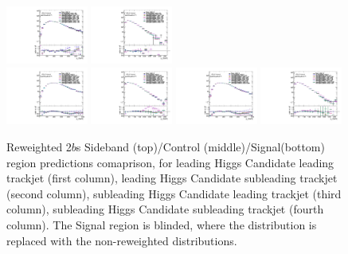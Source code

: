 \begin{figure}[htbp!]
\begin{center}
\includegraphics[width=0.24\textwidth,angle=-90]{figures/boosted/AppendixReweight/Compare/Data_TwoTag_split_Control_directcompare_sublHCand_trk0_Pt_1.pdf}
\includegraphics[width=0.24\textwidth,angle=-90]{figures/boosted/AppendixReweight/Compare/Data_TwoTag_split_Control_directcompare_sublHCand_trk1_Pt_1.pdf}\\
\includegraphics[width=0.24\textwidth,angle=-90]{figures/boosted/AppendixReweight/Compare/Data_TwoTag_split_Signal_directcompare_leadHCand_trk0_Pt_1.pdf}
\includegraphics[width=0.24\textwidth,angle=-90]{figures/boosted/AppendixReweight/Compare/Data_TwoTag_split_Signal_directcompare_leadHCand_trk1_Pt_1.pdf}
\includegraphics[width=0.24\textwidth,angle=-90]{figures/boosted/AppendixReweight/Compare/Data_TwoTag_split_Signal_directcompare_sublHCand_trk0_Pt_1.pdf}
\includegraphics[width=0.24\textwidth,angle=-90]{figures/boosted/AppendixReweight/Compare/Data_TwoTag_split_Signal_directcompare_sublHCand_trk1_Pt_1.pdf}\\
\caption{Reweighted 2$b$s Sideband (top)/Control (middle)/Signal(bottom) region predictions comaprison, for leading Higgs Candidate leading trackjet \pt (first column),  leading Higgs Candidate subleading trackjet \pt (second column), subleading Higgs Candidate leading trackjet \pt (third column), subleading Higgs Candidate subleading trackjet \pt (fourth column). The Signal region is blinded, where the distribution is replaced with the non-reweighted distributions.}
\label{fig:app-rw-comp-2bs-trkjet}
\end{center}
\end{figure}


